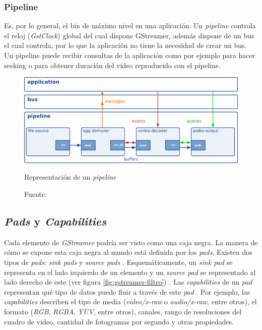 \documentclass[a4paper,openright,12pt]{report}
\begin{document}
\subsubsection{Pipeline}
Es, por lo general, el bin de máximo nivel en una aplicación. Un
\textit{pipeline} controla el reloj (\textit{GstClock}) global del cual dispone
GStreamer, además dispone de un bus el cual controla, por lo que la aplicación
no tiene la necesidad de crear un bus. Un pipeline puede recibir consultas de
la aplicación como por ejemplo para hacer seeking o para obtener duración del
video reproducido con el pipeline.

\begin{figure}[h]
  \centering
    \includegraphics[width=\textwidth]{../images/ad-pipeline.png}\par
  \caption{Representación de un \textit{pipeline}}
  \caption*{Fuente: \cite{taymans2016gstreamer}}
\end{figure}

\subsection{\textit{Pads} y \textit{Capabilities}}
Cada elemento de \textit{GStreamer} podría ser visto como una caja negra. La
manera de cómo se expone esta caja negra al mundo está definida por los
\textit{pads}. Existen dos tipos de \textit{pads}: \textit{sink pads} y
\textit{source pads} \cite{taymans2016gstreamer}. Esquemáticamente, un
\textit{sink pad} se representa en el lado izquierdo de un elemento y un
\textit{source pad} se representado al lado derecho de este
(ver figura \ref{fig:gstreamer-filtro}) \cite{taymans2016gstreamer}. Las
\textit{capabilities} de un \textit{pad} representan
qué tipo de datos puede fluir a través de este \textit{pad}
\cite{taymans2016gstreamer}. Por ejemplo, las \textit{capabilities} describen el
tipo de media (\textit{video/x-raw} o \textit{audio/x-raw}, entre otros), el
formato (\textit{RGB}, \textit{RGBA}, \textit{YUV}, entre otros), canales, rango
de resoluciones del cuadro de video, cantidad de fotogramas por segundo y otras
propiedades.
\end{document}

